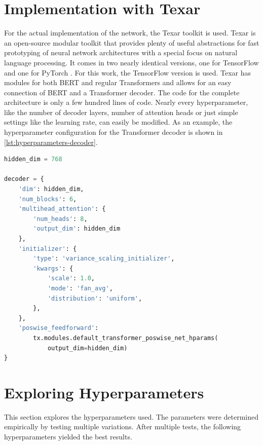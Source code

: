 \section{Implementation with Texar}

For the actual implementation of the network, the Texar toolkit \cite{hu2019texar} is used.
Texar is an open-source modular toolkit that provides plenty of useful abstractions for fast prototyping of neural network architectures with a special focus on natural language processing.
It comes in two nearly identical versions, one for TensorFlow \cite{tensorflow2015-whitepaper} and one for PyTorch \cite{NEURIPS2019_9015}.  
For this work, the TensorFlow version is used.
Texar has modules for both BERT and regular Transformers and allows for an easy connection of BERT and a Transformer decoder.
The code for the complete architecture is only a few hundred lines of code.
Nearly every hyperparameter, like the number of decoder layers, number of attention heads or just simple settings like the learning rate, can easily be modified.
As an example, the hyperparameter configuration for the Transformer decoder is shown in \cref{lst:hyperparameters-decoder}.

\begin{lstlisting}[numbers=none,language=Python,caption={Hyperparameters for Transformer decoder},captionpos=b,label=lst:hyperparameters-decoder,float]
hidden_dim = 768

decoder = {
    'dim': hidden_dim,
    'num_blocks': 6,
    'multihead_attention': {
        'num_heads': 8,
        'output_dim': hidden_dim
    },
    'initializer': {
        'type': 'variance_scaling_initializer',
        'kwargs': {
            'scale': 1.0,
            'mode': 'fan_avg',
            'distribution': 'uniform',
        },
    },
    'poswise_feedforward': 
        tx.modules.default_transformer_poswise_net_hparams(
            output_dim=hidden_dim)
}
\end{lstlisting}


\section{Exploring Hyperparameters}

This section explores the hyperparameters used.
The parameters were determined empirically by testing multiple variations.
After multiple tests, the following hyperparameters yielded the best results.
